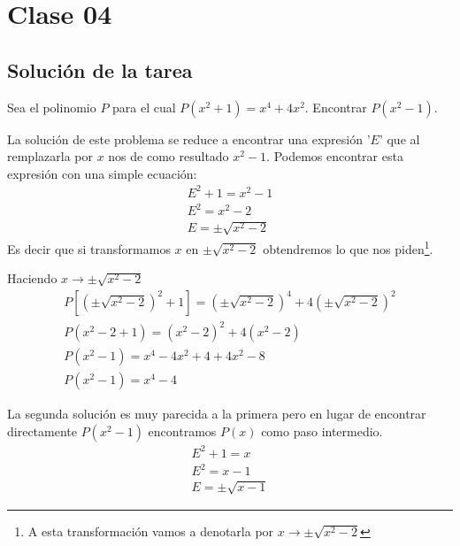 \section{Clase 04}\label{sec:clase-04}

    \subsection{Solución de la tarea}\label{subsec:solucion-tarea}

        \begin{section-problem}
            Sea el polinomio $P$ para el cual $P(x^2 + 1) = x^4 + 4x^2$. Encontrar $P(x^2 - 1)$.

            {
                La solución de este problema se reduce a encontrar una expresión '$E$' que al remplazarla por $x$ nos de como resultado $x^2 - 1$.
                Podemos encontrar esta expresión con una simple ecuación:
                \begin{gather*}
                    E^2 + 1 = x^2 - 1 \\
                    E^2 = x^2 - 2 \\
                    E = \pm \sqrt{x^2 - 2}
                \end{gather*}
                Es decir que si transformamos $x$ en $\pm \sqrt{x^2 - 2}$ obtendremos lo que nos piden\footnote{A esta transformación vamos
                a denotarla por $x \rightarrow \pm \sqrt{x^2 - 2}$}.

                Haciendo $x \rightarrow \pm \sqrt{x^2 - 2}$
                \begin{gather*}
                    P\left[ \left(\pm \sqrt{x^2 - 2}\right)^2 + 1 \right] = \left(\pm \sqrt{x^2 - 2}\right)^4 + 4 \left(\pm \sqrt{x^2 - 2}\right)^2 \\
                    P\left( x^2 - 2 + 1 \right) = \left(x^2 - 2\right)^2 + 4 \left(x^2 - 2\right)\\
                    P\left( x^2 - 1 \right) = x^4 - 4 x^2 + 4 + 4 x^2 - 8\\
                    P\left( x^2 - 1 \right) = \boxed{x^4 - 4}
                \end{gather*}
            }

            {
                La segunda solución es muy parecida a la primera pero en lugar de
                encontrar directamente $P(x^2 - 1)$ encontramos $P(x)$ como paso intermedio.
                \begin{gather*}
                    E^2 + 1 = x \\
                    E^2 = x - 1 \\
                    E = \pm \sqrt{x - 1}
                \end{gather*}

}
\end{section-problem}
